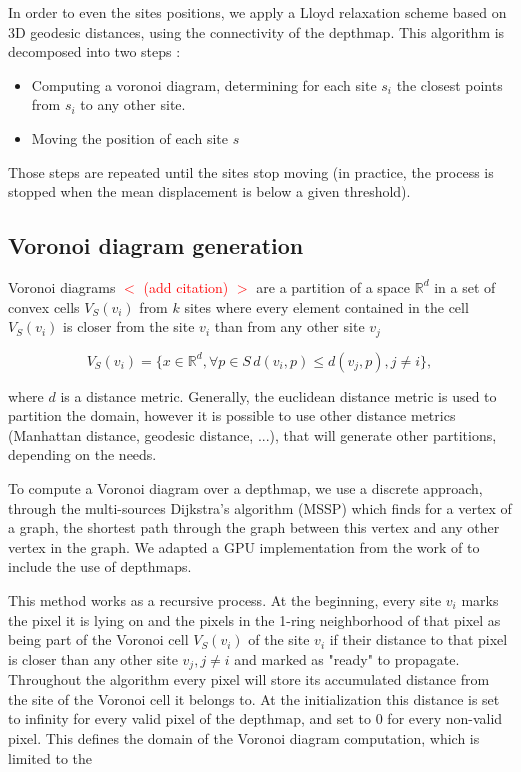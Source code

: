 \documentclass[11pt,fleqn]{book} %
\newcommand{\arnaud}[1]{\textcolor{red}{$<$ #1 $>$}}
\begin{document}
In order to even the sites positions, we apply a Lloyd relaxation scheme based on 3D geodesic distances, using the connectivity of the depthmap.
This algorithm is decomposed into two steps : 
\begin{itemize}
	\item Computing a voronoi diagram, determining for each site $s_i$ the closest points from $s_i$ to any other site.
	\item Moving the position of each site $s$
\end{itemize}

Those steps are repeated until the sites stop moving (in practice, the process is stopped when the mean displacement is below a given threshold).

\subsection{Voronoi diagram generation}
Voronoi diagrams \arnaud{(add citation)} are a partition of a space $\mathbb{R}^d$ in a set of convex cells $V_S(v_i)$ from $k$ sites where every element contained in the cell $V_S(v_i)$ is closer from the site $v_i$ than from any other site $v_j$

\begin{equation}
\label{eq:voronoi_cell}
	V_S(v_i) = \{ x \in \mathbb{R}^d, \forall p \in S\, d(v_i,p) \leq d(v_j,p), j \neq i\},
\end{equation}

where $d$ is a distance metric. Generally, the euclidean distance metric is used to partition the domain, however it is possible to use other distance metrics (Manhattan distance, geodesic distance, ...), that will generate other partitions, depending on the needs.

To compute a Voronoi diagram over a depthmap, we use a discrete approach, through the multi-sources Dijkstra's algorithm (MSSP) \cite{Dij59} which finds for a vertex of a graph, the shortest path through the graph between this vertex and any other vertex in the graph.
We adapted a GPU implementation from the work of \cite{PPA16} to include the use of depthmaps.

This method works as a recursive process. 
At the beginning, every site $v_i$ marks the pixel it is lying on and the pixels in the 1-ring neighborhood of that pixel as being part of the Voronoi cell $V_S(v_i)$ of the site $v_i$ if their distance to that pixel is closer than any other site $v_j, j \neq i$ and marked as "ready" to propagate.
Throughout the algorithm every pixel will store its accumulated distance from the site of the Voronoi cell it belongs to. 
At the initialization this distance is set to infinity for every valid pixel of the depthmap, and set to 0 for every non-valid pixel.
This defines the domain of the Voronoi diagram computation, which is limited to the 
\end{document}
